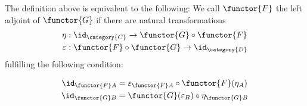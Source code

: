 \documentclass[DIN, pagenumber=false, fontsize=11pt, parskip=half, colorinlistoftodos, svgnames]{scrartcl}
\begin{document}
	\begin{proposition}
		\label{prop.: triangleIdentity}
		The definition above is equivalent to the following: 
		We call $\functor{F} $ the left adjoint of $\functor{G} $ if there are natural transformations 
		\begin{align*}
			\eta &: \id_\category{C} \rightarrow \functor{G} \circ \functor{F}
			\\
			\varepsilon &: \functor{F} \circ \functor{G} \rightarrow \id_\category{D}
		\end{align*}
		fulfilling the following condition: 
		
		\begin{align*}
			\id_{\functor{F}A} 
			&= \varepsilon_{\functor{F}A} \circ \functor{F}(\eta_A)
			\\
			\id_{\functor{G}B} 
			&= \functor{G}(\varepsilon_B) \circ \eta_{\functor{G}B}
		\end{align*}
		

		
	\end{proposition}
	
\end{document}
